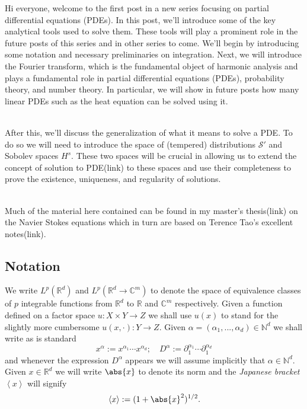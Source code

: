 \documentclass[
]{article}
\begin{document}
Hi everyone, welcome to the first post in a new series focusing on
partial differential equations (PDEs). In this post, we'll introduce
some of the key analytical tools used to solve them. These tools will
play a prominent role in the future posts of this series and in other
series to come. We'll begin by introducing some notation and necessary
preliminaries on integration. Next, we will introduce the Fourier
transform, which is the fundamental object of harmonic analysis and
plays a fundamental role in partial differential equations (PDEs),
probability theory, and number theory. In particular, we will show in
future posts how many linear PDEs such as the heat equation can be
solved using it.\\
\strut \\
After this, we'll discuss the generalization of what it means to solve a
PDE. To do so we will need to introduce the space of (tempered)
distributions \({\mathcal S}'\) and Sobolev spaces \(H^s\). These two
spaces will be crucial in allowing us to extend the concept of solution
to PDE(link) to these spaces and use their completeness to prove the
existence, uniqueness, and regularity of solutions.\\
\strut \\
Much of the material here contained can be found in my master's
thesis(link) on the Navier Stokes equations which in turn are based on
Terence Tao's excellent notes(link).

\hypertarget{notation}{%
\subsection*{Notation}\label{notation}}

We write \(L^p({\mathbb R}^d)\) and
\(L^p({\mathbb R}^d\to\mathbb{C}^m)\) to denote the space of equivalence
classes of \(p\) integrable functions from \({\mathbb R}^d\) to
\({\mathbb R}\) and \(\mathbb{C}^m\) respectively. Given a function
defined on a factor space \(u:X\times Y\rightarrow Z\) we shall use
\(u(x)\) to stand for the slightly more cumbersome
\(u(x,\cdot ):Y\rightarrow Z\). Given
\(\alpha=(\alpha_1,...,\alpha_d)\in\mathbb{N}^d\) we shall write as is
standard
\[x^\alpha:=x^{\alpha_1}\cdots  x^{\alpha_d};\quad D^\alpha:=\partial_1^{\alpha_1}\cdots\partial_1^{\alpha_d}\]
and whenever the expression \(D^\alpha\) appears we will assume
implicitly that \(\alpha\in\mathbb{N}^d\). Given \(x\in{\mathbb R}^d\)
we will write \(\abs{x}\) to denote its norm and the \emph{Japanese
bracket} \(\left\langle x\right\rangle\) will signify
\[\left\langle x\right\rangle:=(1+\abs{x}^2)^{1/2}.\]
\end{document}
